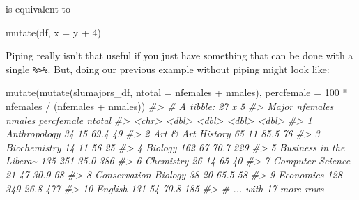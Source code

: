 \documentclass[
]{book}
\newenvironment{Shaded}{\begin{snugshade}}{\end{snugshade}}
\newcommand{\AttributeTok}[1]{\textcolor[rgb]{0.77,0.63,0.00}{#1}}
\newcommand{\CommentTok}[1]{\textcolor[rgb]{0.56,0.35,0.01}{\textit{#1}}}
\newcommand{\DecValTok}[1]{\textcolor[rgb]{0.00,0.00,0.81}{#1}}
\newcommand{\FunctionTok}[1]{\textcolor[rgb]{0.00,0.00,0.00}{#1}}
\newcommand{\NormalTok}[1]{#1}
\newcommand{\SpecialCharTok}[1]{\textcolor[rgb]{0.00,0.00,0.00}{#1}}
\begin{document}
is equivalent to

\begin{Shaded}
\begin{Highlighting}[]
\FunctionTok{mutate}\NormalTok{(df, }\AttributeTok{x =}\NormalTok{ y }\SpecialCharTok{+} \DecValTok{4}\NormalTok{)}
\end{Highlighting}
\end{Shaded}

Piping really isn't that useful if you just have something that can be done with a single \texttt{\%\textgreater{}\%}. But, doing our previous example without piping might look like:

\begin{Shaded}
\begin{Highlighting}[]
\FunctionTok{mutate}\NormalTok{(}\FunctionTok{mutate}\NormalTok{(slumajors\_df, }\AttributeTok{ntotal =}\NormalTok{ nfemales }\SpecialCharTok{+}\NormalTok{ nmales), }\AttributeTok{percfemale =} \DecValTok{100} \SpecialCharTok{*}\NormalTok{ nfemales }\SpecialCharTok{/}\NormalTok{ (nfemales }\SpecialCharTok{+}\NormalTok{ nmales))}
\CommentTok{\#\textgreater{} \# A tibble: 27 x 5}
\CommentTok{\#\textgreater{}    Major                   nfemales nmales percfemale ntotal}
\CommentTok{\#\textgreater{}    \textless{}chr\textgreater{}                      \textless{}dbl\textgreater{}  \textless{}dbl\textgreater{}      \textless{}dbl\textgreater{}  \textless{}dbl\textgreater{}}
\CommentTok{\#\textgreater{}  1 Anthropology                  34     15       69.4     49}
\CommentTok{\#\textgreater{}  2 Art \& Art History             65     11       85.5     76}
\CommentTok{\#\textgreater{}  3 Biochemistry                  14     11       56       25}
\CommentTok{\#\textgreater{}  4 Biology                      162     67       70.7    229}
\CommentTok{\#\textgreater{}  5 Business in the Libera\textasciitilde{}      135    251       35.0    386}
\CommentTok{\#\textgreater{}  6 Chemistry                     26     14       65       40}
\CommentTok{\#\textgreater{}  7 Computer Science              21     47       30.9     68}
\CommentTok{\#\textgreater{}  8 Conservation Biology          38     20       65.5     58}
\CommentTok{\#\textgreater{}  9 Economics                    128    349       26.8    477}
\CommentTok{\#\textgreater{} 10 English                      131     54       70.8    185}
\CommentTok{\#\textgreater{} \# ... with 17 more rows}
\end{Highlighting}
\end{Shaded}
\end{document}
